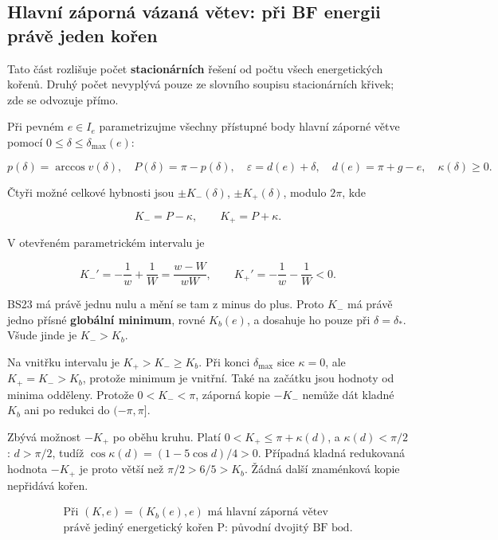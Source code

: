 \documentclass[11pt,a4paper]{article}
\theoremstyle{remark}\newtheorem{remark}[theorem]{Poznámka}
\numberwithin{equation}{section}
\begin{document}
\hypertarget{hlavnuxed-zuxe1pornuxe1-vuxe1zanuxe1-vux11btev-pux159i-bf-energii-pruxe1vux11b-jeden-koux159en}{%
\subsection{Hlavní záporná vázaná větev: při BF energii právě jeden
kořen}\label{hlavnuxed-zuxe1pornuxe1-vuxe1zanuxe1-vux11btev-pux159i-bf-energii-pruxe1vux11b-jeden-koux159en}}

Tato část rozlišuje počet \textbf{stacionárních} řešení od počtu všech
energetických kořenů. Druhý počet nevyplývá pouze ze slovního soupisu
stacionárních křivek; zde se odvozuje přímo.

Při pevném \(e\in I_e\) parametrizujme všechny přístupné body hlavní
záporné větve pomocí \(0\le\delta\le\delta_{\max}(e)\):

\[
p(\delta)=\arccos v(\delta),\quad P(\delta)=\pi-p(\delta),
\quad \varepsilon=d(e)+\delta,\quad d(e)=\pi+g-e,
\quad \kappa(\delta)\ge0.
\tag{CG28}
\]

Čtyři možné celkové hybnosti jsou \(\pm K_-(\delta)\),
\(\pm K_+(\delta)\), modulo \(2\pi\), kde

\[
K_-=P-\kappa,\qquad K_+=P+\kappa.
\]

V otevřeném parametrickém intervalu je

\[
K_-'=-\frac1w+\frac1W=\frac{w-W}{wW},
\qquad K_+'=-\frac1w-\frac1W<0.
\tag{CG29}
\]

BS23 má právě jednu nulu a mění se tam z minus do plus. Proto \(K_-\) má
právě jedno přísné \textbf{globální minimum}, rovné \(K_b(e)\), a
dosahuje ho pouze při \(\delta=\delta_*\). Všude jinde je \(K_->K_b\).

Na vnitřku intervalu je \(K_+>K_-\ge K_b\). Při konci \(\delta_{\max}\)
sice \(\kappa=0\), ale \(K_+=K_->K_b\), protože minimum je vnitřní. Také
na začátku jsou hodnoty od minima odděleny. Protože \(0<K_-<\pi\),
záporná kopie \(-K_-\) nemůže dát kladné \(K_b\) ani po redukci do
\((-\pi,\pi]\).

Zbývá možnost \(-K_+\) po oběhu kruhu. Platí \(0<K_+\le\pi+\kappa(d)\),
a \(\kappa(d)<\pi/2\): \(d>\pi/2\), tudíž
\(\cos\kappa(d)=(1-5\cos d)/4>0\). Případná kladná redukovaná hodnota
\(-K_+\) je proto větší než \(\pi/2>6/5>K_b\). Žádná další znaménková
kopie nepřidává kořen.

\[
\boxed{\begin{gathered}
\text{Při }(K,e)=(K_b(e),e)\text{ má hlavní záporná větev}\\
\text{právě jediný energetický kořen P: původní dvojitý BF bod.}
\end{gathered}}
\tag{CG30}
\]
\end{document}

